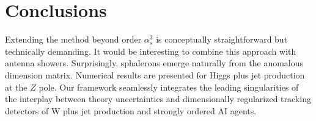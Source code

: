 \section{Conclusions}\label{sec:conclusions}

Extending the method beyond order $\alpha_s^3$ is conceptually
straightforward but technically demanding. It would be interesting to
combine this approach with antenna showers. Surprisingly, sphalerons
emerge naturally from the anomalous dimension matrix. Numerical results
are presented for Higgs plus jet production at the $Z$ pole. Our
framework seamlessly integrates the leading singularities of the
interplay between theory uncertainties and dimensionally regularized
tracking detectors of W plus jet production and strongly ordered AI
agents.

